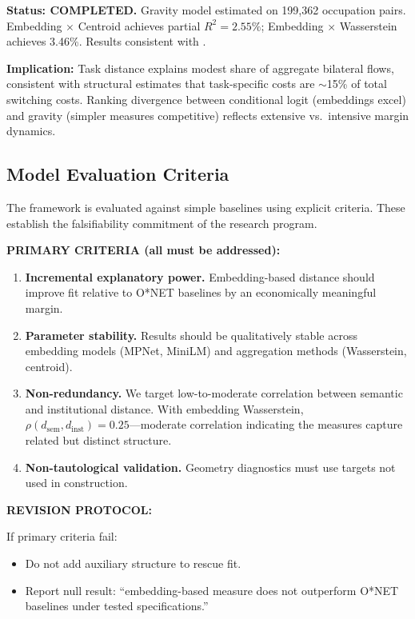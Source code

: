 \documentclass[12pt]{article}
\begin{document}
\textbf{Status: COMPLETED.} Gravity model estimated on 199,362 occupation pairs. Embedding $\times$ Centroid achieves partial $R^2 = 2.55\%$; Embedding $\times$ Wasserstein achieves 3.46\%. Results consistent with \citet{CortesGallipoli2018}.

\textbf{Implication:} Task distance explains modest share of aggregate bilateral flows, consistent with structural estimates that task-specific costs are $\sim$15\% of total switching costs. Ranking divergence between conditional logit (embeddings excel) and gravity (simpler measures competitive) reflects extensive vs.\ intensive margin dynamics.


\subsection{Model Evaluation Criteria}
\label{subsec:evaluation}


The framework is evaluated against simple baselines using explicit criteria. These establish the falsifiability commitment of the research program.


\medskip
\noindent\textbf{PRIMARY CRITERIA (all must be addressed):}

\begin{enumerate}
    \item \textbf{Incremental explanatory power.} Embedding-based distance should improve fit relative to O*NET baselines by an economically meaningful margin.
    
    \item \textbf{Parameter stability.} Results should be qualitatively stable across embedding models (MPNet, MiniLM) and aggregation methods (Wasserstein, centroid).
    
    \item \textbf{Non-redundancy.} We target low-to-moderate correlation between semantic and institutional distance. With embedding Wasserstein, $\rho(d_{\mathrm{sem}}, d_{\mathrm{inst}}) = 0.25$---moderate correlation indicating the measures capture related but distinct structure.
    
    \item \textbf{Non-tautological validation.} Geometry diagnostics must use targets not used in construction.
\end{enumerate}


\medskip
\noindent\textbf{REVISION PROTOCOL:}

If primary criteria fail:
\begin{itemize}
    \item Do not add auxiliary structure to rescue fit.
    \item Report null result: ``embedding-based measure does not outperform O*NET baselines under tested specifications.''
\end{itemize}
\end{document}
